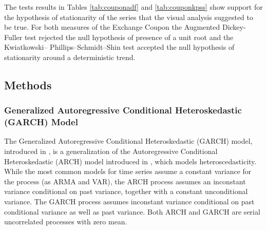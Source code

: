 \documentclass[a4paper]{article}
\begin{document}





The tests results in Tables \ref{tab:couponadf} and \ref{tab:couponkpss} show support for the hypothesis of stationarity of the series that the visual analysis suggested to be true. For both measures of the Exchange Coupon the Augmented Dickey-Fuller test rejected the null hypothesis of presence of a unit root and the Kwiatkowski– Phillips–Schmidt–Shin test accepted the null hypothesis of stationarity around a deterministic trend.


\begin{comment}

On ten of October 2015 a impeachment request for president Dilma Rousseff was handed to the Chamber Of Representatives' president, who accepted the request on December second. The opening of the impeachment process was accepted by the special impeachment committee on eleven of April 2016.

\end{comment}


\subsection{Methods}

\subsubsection{Generalized Autoregressive Conditional Heteroskedastic (GARCH) Model}

The Generalized Autoregressive Conditional Heteroskedastic (GARCH) model, introduced in \citet{bollerslev1986}, is a generalization of the Autoregressive Conditional Heteroskedastic (ARCH) model introduced in \citet{engle1982}, which models heteroscedasticity. While the most common models for time series assume a constant variance for the process (as ARMA and VAR), the ARCH process assumes an inconstant variance conditional on past variance, together with a constant unconditional variance. The GARCH process assumes inconstant variance conditional on past conditional variance as well as past variance. Both ARCH and GARCH are serial uncorrelated processes with zero mean.
\end{document}
